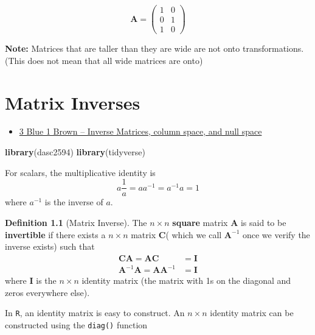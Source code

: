 \documentclass[
]{book}
\newenvironment{Shaded}{\begin{snugshade}}{\end{snugshade}}
\newcommand{\KeywordTok}[1]{\textcolor[rgb]{0.13,0.29,0.53}{\textbf{#1}}}
\newcommand{\NormalTok}[1]{#1}
\providecommand{\tightlist}{%
  \setlength{\itemsep}{0pt}\setlength{\parskip}{0pt}}
\theoremstyle{definition}
\newtheorem{definition}{Definition}[chapter]
\theoremstyle{definition}
\theoremstyle{definition}
\theoremstyle{definition}
\theoremstyle{remark}
\begin{document}
\[
\mathbf{A} = \begin{pmatrix}
1 & 0  \\
0 & 1  \\
1 & 0
\end{pmatrix}
\]

\textbf{Note:} Matrices that are taller than they are wide are not onto transformations. (This does not mean that all wide matrices are onto)

\hypertarget{matrix-inverse}{%
\chapter{Matrix Inverses}\label{matrix-inverse}}

\begin{itemize}
\tightlist
\item
  \href{https://www.3blue1brown.com/lessons/inverse-matrices}{3 Blue 1 Brown -- Inverse Matrices, column space, and null space}
\end{itemize}

\begin{Shaded}
\begin{Highlighting}[]
\KeywordTok{library}\NormalTok{(dasc2594)}
\KeywordTok{library}\NormalTok{(tidyverse)}
\end{Highlighting}
\end{Shaded}

For scalars, the multiplicative identity is
\[
a \frac{1}{a} = a a^{-1} = a^{-1} a = 1
\]
where \(a^{-1}\) is the inverse of \(a\).

\begin{definition}[Matrix Inverse]
\protect\hypertarget{def:matrix-inverse}{}\label{def:matrix-inverse}The \(n \times n\) \textbf{square} matrix \(\mathbf{A}\) is said to be \textbf{invertible} if there exists a \(n \times n\) matrix \(\mathbf{C}\)( which we call \(\mathbf{A}^{-1}\) once we verify the inverse exists) such that
\[
\begin{aligned}
\mathbf{C}\mathbf{A} = \mathbf{A} \mathbf{C} & = \mathbf{I} \\
\mathbf{A}^{-1} \mathbf{A} = \mathbf{A} \mathbf{A}^{-1} & = \mathbf{I}
\end{aligned}
\]
where \(\mathbf{I}\) is the \(n \times n\) identity matrix (the matrix with 1s on the diagonal and zeros everywhere else).
\end{definition}

In \texttt{R}, an identity matrix is easy to construct. An \(n \times n\) identity matrix can be constructed using the \texttt{diag()} function
\end{document}
